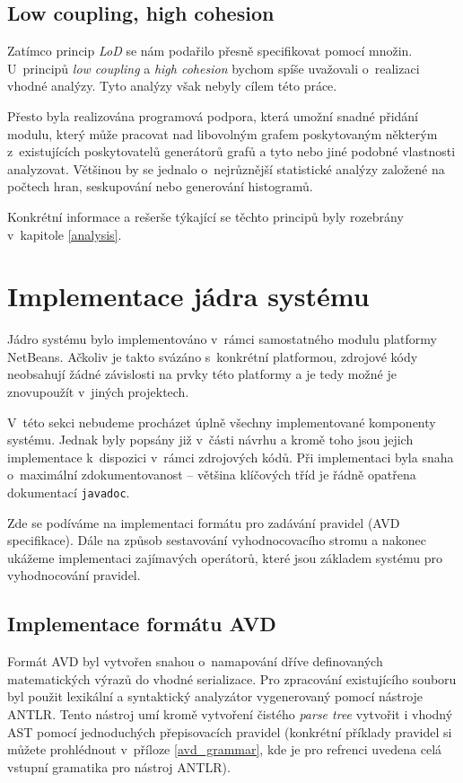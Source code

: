 \subsection{Low coupling, high cohesion}
Zatímco princip \emph{LoD} se nám podařilo přesně specifikovat pomocí množin. U~principů \emph{low coupling} a \emph{high cohesion} bychom spíše uvažovali o~realizaci vhodné analýzy. Tyto analýzy však nebyly cílem této práce.

Přesto byla realizována programová podpora, která umožní snadné přidání modulu, který může pracovat nad libovolným grafem poskytovaným některým z~existujících poskytovatelů generátorů grafů a tyto nebo jiné podobné vlastnosti analyzovat. Většinou by se jednalo o~nejrůznější statistické analýzy založené na počtech hran, seskupování nebo generování histogramů.

Konkrétní informace a rešerše týkající se těchto principů byly rozebrány v~kapitole \ref{analysis}.

\section{Implementace jádra systému}
Jádro systému bylo implementováno v~rámci samostatného modulu platformy NetBeans. Ačkoliv je takto svázáno s~konkrétní platformou, zdrojové kódy neobsahují žádné závislosti na prvky této platformy a je tedy možné je znovupoužít v~jiných projektech.

V~této sekci nebudeme procházet úplně všechny implementované komponenty systému. Jednak byly popsány již v~části návrhu a kromě toho jsou jejich implementace k~dispozici v~rámci zdrojových kódů. Při implementaci byla snaha o~maximální zdokumentovanost -- většina klíčových tříd je řádně opatřena dokumentací \verb-javadoc-.

Zde se podíváme na implementaci formátu pro zadávání pravidel (AVD specifikace). Dále na způsob sestavování vyhodnocovacího stromu a nakonec ukážeme implementaci zajímavých operátorů, které jsou základem systému pro vyhodnocování pravidel.

\subsection{Implementace formátu AVD}
Formát AVD byl vytvořen snahou o~namapování dříve definovaných matematických výrazů do vhodné serializace. Pro zpracování existujícího souboru byl použit lexikální a syntaktický analyzátor vygenerovaný pomocí nástroje ANTLR. Tento nástroj umí kromě vytvoření čistého \emph{parse tree} vytvořit i vhodný AST pomocí jednoduchých přepisovacích pravidel (konkrétní příklady pravidel si můžete prohlédnout v~příloze \ref{avd_grammar}, kde je pro refrenci uvedena celá vstupní gramatika pro nástroj ANTLR).

